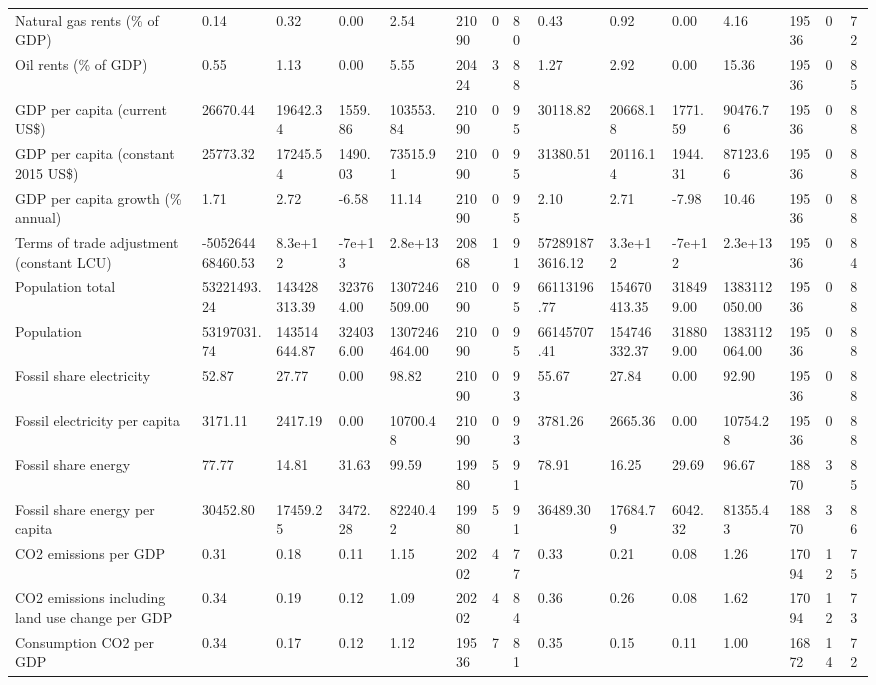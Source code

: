 \begin{longtable}{lllllllllllllll}
\addlinespace
Natural gas rents (\% of GDP) & 0.14 & 0.32 & 0.00 & 2.54 & 21090 & 0 & 80 & 0.43 & 0.92 & 0.00 & 4.16 & 19536 & 0 & 72\\
Oil rents (\% of GDP) & 0.55 & 1.13 & 0.00 & 5.55 & 20424 & 3 & 88 & 1.27 & 2.92 & 0.00 & 15.36 & 19536 & 0 & 85\\
GDP per capita (current US\$) & 26670.44 & 19642.34 & 1559.86 & 103553.84 & 21090 & 0 & 95 & 30118.82 & 20668.18 & 1771.59 & 90476.76 & 19536 & 0 & 88\\
GDP per capita (constant 2015 US\$) & 25773.32 & 17245.54 & 1490.03 & 73515.91 & 21090 & 0 & 95 & 31380.51 & 20116.14 & 1944.31 & 87123.66 & 19536 & 0 & 88\\
GDP per capita growth (\% annual) & 1.71 & 2.72 & -6.58 & 11.14 & 21090 & 0 & 95 & 2.10 & 2.71 & -7.98 & 10.46 & 19536 & 0 & 88\\
\addlinespace
Terms of trade adjustment (constant LCU) & -505264468460.53 & 8.3e+12 & -7e+13 & 2.8e+13 & 20868 & 1 & 91 & 572891873616.12 & 3.3e+12 & -7e+12 & 2.3e+13 & 19536 & 0 & 84\\
Population total & 53221493.24 & 143428313.39 & 323764.00 & 1307246509.00 & 21090 & 0 & 95 & 66113196.77 & 154670413.35 & 318499.00 & 1383112050.00 & 19536 & 0 & 88\\
Population & 53197031.74 & 143514644.87 & 324036.00 & 1307246464.00 & 21090 & 0 & 95 & 66145707.41 & 154746332.37 & 318809.00 & 1383112064.00 & 19536 & 0 & 88\\
Fossil share electricity & 52.87 & 27.77 & 0.00 & 98.82 & 21090 & 0 & 93 & 55.67 & 27.84 & 0.00 & 92.90 & 19536 & 0 & 88\\
Fossil electricity per capita & 3171.11 & 2417.19 & 0.00 & 10700.48 & 21090 & 0 & 93 & 3781.26 & 2665.36 & 0.00 & 10754.28 & 19536 & 0 & 88\\
\addlinespace
Fossil share energy & 77.77 & 14.81 & 31.63 & 99.59 & 19980 & 5 & 91 & 78.91 & 16.25 & 29.69 & 96.67 & 18870 & 3 & 85\\
Fossil share energy per capita & 30452.80 & 17459.25 & 3472.28 & 82240.42 & 19980 & 5 & 91 & 36489.30 & 17684.79 & 6042.32 & 81355.43 & 18870 & 3 & 86\\
CO2 emissions per GDP & 0.31 & 0.18 & 0.11 & 1.15 & 20202 & 4 & 77 & 0.33 & 0.21 & 0.08 & 1.26 & 17094 & 12 & 75\\
CO2 emissions including land use change per GDP & 0.34 & 0.19 & 0.12 & 1.09 & 20202 & 4 & 84 & 0.36 & 0.26 & 0.08 & 1.62 & 17094 & 12 & 73\\
Consumption CO2 per GDP & 0.34 & 0.17 & 0.12 & 1.12 & 19536 & 7 & 81 & 0.35 & 0.15 & 0.11 & 1.00 & 16872 & 14 & 72\\

\end{longtable}
